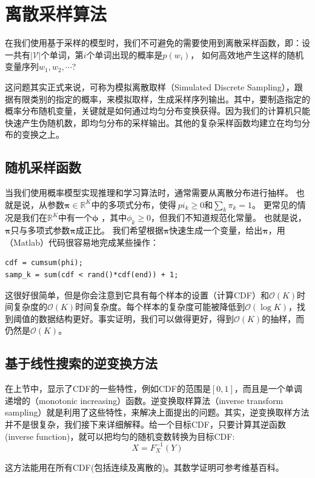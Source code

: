 \section{离散采样算法}
在我们使用基于采样的模型时，我们不可避免的需要使用到离散采样函数，即：设一共有$|\mathcal{V}|$个单词，第$i$个单词出现的概率是$p(w_i)$， 如何高效地产生这样的随机变量序列$w_1,w_2,\cdots$?

这问题其实正式来说，可称为模拟离散取样（Simulated Discrete Sampling），跟据有限类别的指定的概率，来模拟取样，生成采样序列输出。其中，要制造指定的概率分布随机变量，关键就是如何通过均匀分布变换获得。因为我们的计算机只能快速产生伪随机数，即均匀分布的采样输出。其他的复杂采样函数均建立在均匀分布的变换之上。
\subsection{随机采样函数}
当我们使用概率模型实现推理和学习算法时，通常需要从离散分布进行抽样。 也就是说，从参数$\boldsymbol {\pi} \in \mathbb{R} ^ K$中的多项式分布，使得$\ pi_k \geq 0$和$\sum_{k} \pi_k = 1$。 更常见的情况是我们在$\mathbb{R}^K$中有一个$\boldsymbol {\phi}$ ，其中$\phi_k \geq 0$，但我们不知道规范化常量。 也就是说，$\boldsymbol{\pi}$只与多项式参数$\boldsymbol {\pi}$成正比。 我们希望根据$\boldsymbol{\pi}$快速生成一个变量，给出$\boldsymbol {\pi}$，用（Matlab）代码很容易地完成某些操作：
\begin{verbatim}
cdf = cumsum(phi);
samp_k = sum(cdf < rand()*cdf(end)) + 1;
\end{verbatim}
这很好很简单，但是你会注意到它具有每个样本的设置（计算CDF）和$\mathcal {O}(K)$时间复杂度的$\mathcal {O}(K)$时间复杂度。每个样本的复杂度可能被降低到$\mathcal {O}(\log K)$，找到阈值的数据结构更好。事实证明，我们可以做得更好，得到$\mathcal {O}(K)$的抽样，而仍然是$\mathcal {O}(K)$。
\subsection{基于线性搜索的逆变换方法}
在上节中，显示了CDF的一些特性，例如CDF的范围是$[0,1]$，而且是一个单调递增的（monotonic increasing）函数。逆变换取样算法（inverse transform sampling）就是利用了这些特性，来解决上面提出的问题。其实，逆变换取样方法并不是很复杂，我们接下来详细解释。给一个目标CDF，只要计算其逆函数(inverse function)，就可以把均匀的随机变数转换为目标CDF:
\begin{equation}\label{equ:func}
  X=F_X^{-1}(Y)
\end{equation}

这方法能用在所有CDF(包括连续及离散的)。其数学证明可参考维基百科。

